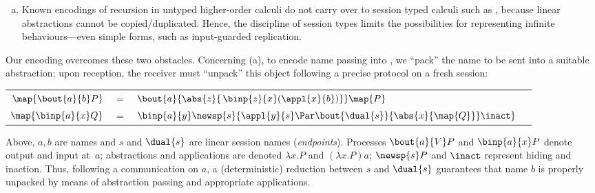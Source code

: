 \begin{enumerate}[a.]
\item %
Known encodings of recursion in untyped higher-order calculi
do not carry over to session typed calculi such as \HOp,
because linear abstractions cannot be copied/duplicated. Hence, the discipline of session types  limits 
the possibilities for representing infinite behaviours---even simple forms, such as input-guarded replication.
\end{enumerate}





\noi
Our encoding overcomes these two obstacles. 
Concerning (a), %
to encode name passing into \HO, 
we ``pack''
the name to be sent into a suitable abstraction; 
upon reception, the receiver must ``unpack'' this object following a precise protocol on a fresh  session:
\begin{center}
\begin{tabular}{rcll}
  $\map{\bout{a}{b} P}$	&$=$&	$\bout{a}{ \abs{z}{\,\binp{z}{x} (\appl{x}{b})} } \map{P}$ \\
  $\map{\binp{a}{x} Q}$	&$=$&	$\binp{a}{y} \newsp{s}{\appl{y}{s} \Par \bout{\dual{s}}{\abs{x}{\map{Q}}} \inact}$
\end{tabular}
\end{center}
Above, 
$a,b$ are names and $s$ and $\dual{s}$ are 
linear session names (\emph{endpoints}).
Processes $\bout{a}{V} P$ and 
$\binp{a}{x} P$ denote output and input at~$a$;   
abstractions and applications are denoted
$\lambda x.P$ and $(\lambda x.P)a$; %
$\newsp{s}P$ and $\inact$ represent hiding and inaction. %
Thus, following a communication on $a$, %
a (deterministic) reduction between  
$s$ and $\dual{s}$ guarantees that name $b$ is properly unpacked by means of abstraction passing
and appropriate applications.



